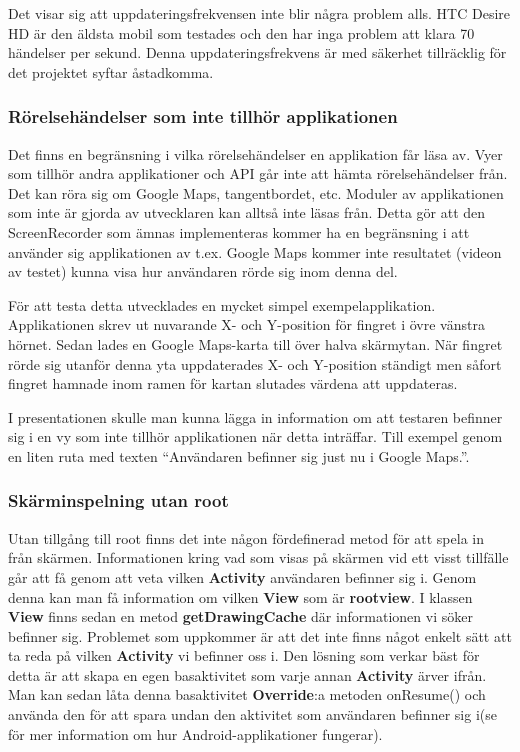 Det visar sig att uppdateringsfrekvensen inte blir några problem alls. HTC Desire HD är den äldsta mobil som testades och den har inga problem att klara 70 händelser per sekund. Denna uppdateringsfrekvens är med säkerhet tillräcklig för det projektet syftar åstadkomma.

\subsubsection{Rörelsehändelser som inte tillhör applikationen}
\label{toucheventsoutofapi}
Det finns en begränsning i vilka rörelsehändelser en applikation får läsa av. Vyer som tillhör andra applikationer och API går inte att hämta rörelsehändelser från. Det kan röra sig om Google Maps, tangentbordet, etc. Moduler av applikationen som inte är gjorda av utvecklaren kan alltså inte läsas från. Detta gör att den ScreenRecorder som ämnas implementeras kommer ha en begränsning i att använder sig applikationen av t.ex. Google Maps kommer inte resultatet (videon av testet) kunna visa hur användaren rörde sig inom denna del.

För att testa detta utvecklades en mycket simpel exempelapplikation. Applikationen skrev ut nuvarande X- och Y-position för fingret i övre vänstra hörnet. Sedan lades en Google Maps-karta till över halva skärmytan. När fingret rörde sig utanför denna yta uppdaterades X- och Y-position ständigt men såfort fingret hamnade inom ramen för kartan slutades värdena att uppdateras.

I presentationen skulle man kunna lägga in information om att testaren befinner sig i en vy som inte tillhör applikationen när detta inträffar. Till exempel genom en liten ruta med texten ``Användaren befinner sig just nu i Google Maps.''.

\subsubsection{Skärminspelning utan root}
\label{screenrecordingwithoutroot}
Utan tillgång till root finns det inte någon fördefinerad metod för att spela in från skärmen. Informationen kring vad som visas på skärmen vid ett visst tillfälle går att få genom att veta vilken \textbf{Activity} användaren befinner sig i. Genom denna kan man få information om vilken \textbf{View} som är \textbf{rootview}. I klassen \textbf{View} finns sedan en metod \textbf{getDrawingCache} där informationen vi söker befinner sig. Problemet som uppkommer är att det inte finns något enkelt sätt att ta reda på vilken \textbf{Activity} vi befinner oss i. Den lösning som verkar bäst för detta är att skapa en egen basaktivitet som varje annan \textbf{Activity} ärver ifrån. Man kan sedan låta denna basaktivitet \textbf{Override}:a metoden onResume() och använda den för att spara undan den aktivitet som användaren befinner sig i(se \parencite{androidfundamentals} för mer information om hur Android-applikationer fungerar).

